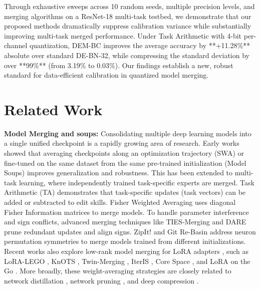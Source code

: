 \documentclass{article}
\begin{document}
Through exhaustive sweeps across 10 random seeds, multiple precision levels, and merging algorithms on a ResNet-18 multi-task testbed, we demonstrate that our proposed methods dramatically suppress calibration variance while substantially improving multi-task merged performance. Under Task Arithmetic with 4-bit per-channel quantization, DEM-BC improves the average accuracy by **+11.28\%** absolute over standard DE-BN-32, while compressing the standard deviation by over **99\%** (from 3.19\% to 0.03\%). Our findings establish a new, robust standard for data-efficient calibration in quantized model merging.

\section{Related Work}
\label{submission-related}
\textbf{Model Merging and soups:} Consolidating multiple deep learning models into a single unified checkpoint is a rapidly growing area of research. Early works showed that averaging checkpoints along an optimization trajectory (SWA) \cite{wortsman22} or fine-tuned on the same dataset from the same pre-trained initialization (Model Soups) improves generalization and robustness. This has been extended to multi-task learning, where independently trained task-specific experts are merged. Task Arithmetic (TA) \cite{ilharco23} demonstrates that task-specific updates (task vectors) can be added or subtracted to edit skills. Fisher Weighted Averaging \cite{matena22} uses diagonal Fisher Information matrices to merge models. To handle parameter interference and sign conflicts, advanced merging techniques like TIES-Merging \cite{yadav23} and DARE \cite{jin23} prune redundant updates and align signs. ZipIt! \cite{stoica23} and Git Re-Basin \cite{ainsworth23} address neuron permutation symmetries to merge models trained from different initializations. Recent works also explore low-rank model merging for LoRA adapters \cite{hu21, dettmers24}, such as LoRA-LEGO \cite{gandhi24}, KnOTS \cite{kim24}, Twin-Merging \cite{lu24}, IterIS \cite{feng25}, Core Space \cite{bussmann25}, and LoRA on the Go \cite{krishna25}. More broadly, these weight-averaging strategies are closely related to network distillation \cite{hinton15}, network pruning \cite{frankle18, liu18, blalock20}, and deep compression \cite{han15}.
\end{document}
